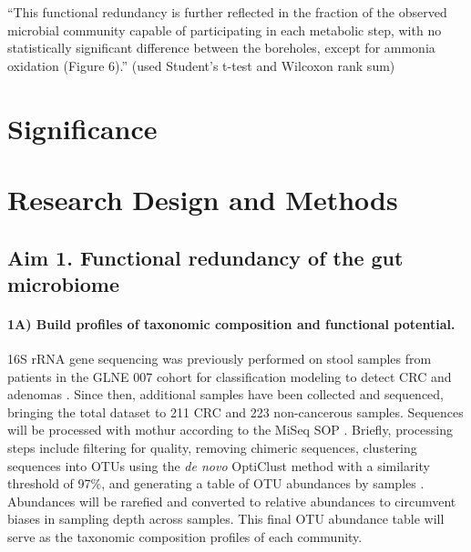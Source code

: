 \documentclass[11pt]{article}
\begin{document}
``This functional redundancy is further reflected in the fraction of the observed microbial community capable of participating in each metabolic step, with no statistically significant difference between the boreholes, except for ammonia oxidation (Figure 6).'' (used Student's t-test and Wilcoxon rank sum) \cite{tully_dynamic_2018}


\section*{Significance} %


\section*{Research Design and Methods}

\subsection*{Aim 1. Functional redundancy of the gut microbiome}

\paragraph{1A) Build profiles of taxonomic composition and functional potential.}

16S rRNA gene sequencing was previously performed on stool samples from patients in the GLNE 007 cohort for classification modeling to detect CRC and adenomas \cite{baxter_microbiota-based_2016}.
Since then, additional samples have been collected and sequenced, bringing the total dataset to 211 CRC and 223 non-cancerous samples.
Sequences will be processed with mothur according to the MiSeq SOP \cite{schloss_introducing_2009, kozich_development_2013}.
Briefly, processing steps include filtering for quality, removing chimeric sequences, clustering sequences into OTUs using the \textit{de novo} OptiClust method with a similarity threshold of 97\%,
and generating a table of OTU abundances by samples \cite{westcott_opticlust_2017}.
Abundances will be rarefied and converted to relative abundances to circumvent biases in sampling depth across samples.
This final OTU abundance table will serve as the taxonomic composition profiles of each community.
\end{document}
